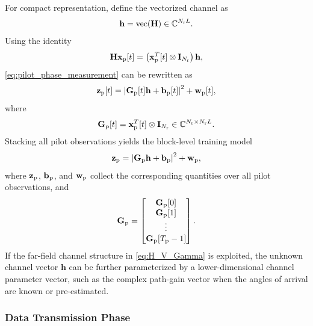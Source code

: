 \documentclass[journal]{IEEEtran}
\begin{document}
For compact representation, define the vectorized channel as
\begin{equation}
\mathbf{h}
=
\operatorname{vec}(\mathbf{H})
\in\mathbb{C}^{N_{\rm r}L}.
\end{equation}
Using the identity
\begin{equation}
\mathbf{H}\mathbf{x}_{\rm p}[t]
=
\left(\mathbf{x}_{\rm p}^T[t]\otimes\mathbf{I}_{N_{\rm r}}\right)\mathbf{h},
\end{equation}
\eqref{eq:pilot_phase_measurement} can be rewritten as
\begin{equation}
\mathbf{z}_{\rm p}[t]
=
\left|
\mathbf{G}_{\rm p}[t]\mathbf{h}
+
\mathbf{b}_{\rm p}[t]
\right|^2
+
\mathbf{w}_{\rm p}[t],
\label{eq:pilot_phase_vectorized}
\end{equation}
where
\begin{equation}
\mathbf{G}_{\rm p}[t]
=
\mathbf{x}_{\rm p}^T[t]\otimes\mathbf{I}_{N_{\rm r}}
\in\mathbb{C}^{N_{\rm r}\times N_{\rm r}L}.
\end{equation}
Stacking all pilot observations yields the block-level training model
\begin{equation}
\mathbf{z}_{\rm p}
=
\left|
\mathbf{G}_{\rm p}\mathbf{h}
+
\mathbf{b}_{\rm p}
\right|^2
+
\mathbf{w}_{\rm p},
\label{eq:block_pilot_phase_model}
\end{equation}
where $\mathbf{z}_{\rm p}$, $\mathbf{b}_{\rm p}$, and $\mathbf{w}_{\rm p}$ collect the corresponding quantities over all pilot observations, and
\begin{equation}
\mathbf{G}_{\rm p}
=
\begin{bmatrix}
\mathbf{G}_{\rm p}[0]\\
\mathbf{G}_{\rm p}[1]\\
\vdots\\
\mathbf{G}_{\rm p}[T_{\rm p}-1]
\end{bmatrix}.
\end{equation}
If the far-field channel structure in \eqref{eq:H_V_Gamma} is exploited, the unknown channel vector $\mathbf{h}$ can be further parameterized by a lower-dimensional channel parameter vector, such as the complex path-gain vector when the angles of arrival are known or pre-estimated.

\subsubsection{Data Transmission Phase}
\end{document}
